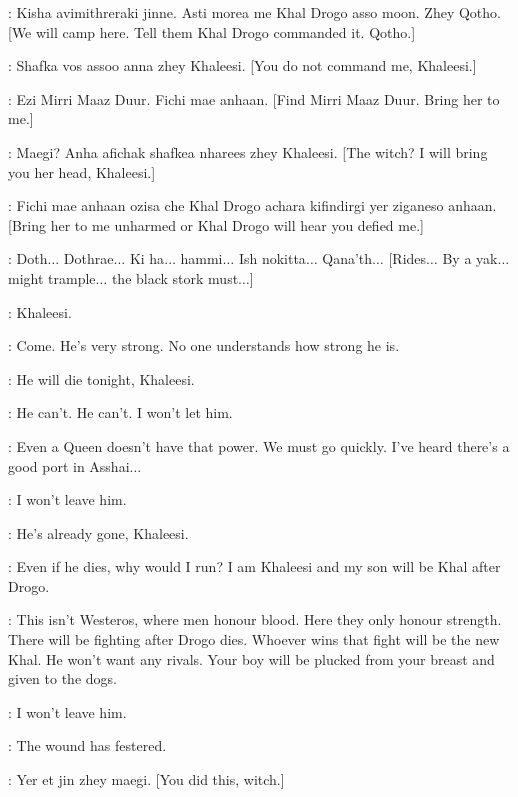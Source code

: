 \DAENERYS: Kisha avimithreraki jinne. Asti morea me Khal Drogo asso moon. Zhey Qotho. [We will camp here. Tell them Khal Drogo commanded it. Qotho.] 

\QOTHO: Shafka vos assoo anna zhey Khaleesi. [You do not command me, Khaleesi.] 

\DAENERYS: Ezi Mirri Maaz Duur. Fichi mae anhaan. [Find Mirri Maaz Duur. Bring her to me.] 

\QOTHO: Maegi? Anha afichak shafkea nharees zhey Khaleesi. [The witch? I will bring you her head, Khaleesi.] 

\DAENERYS: Fichi mae anhaan ozisa che Khal Drogo achara kifindirgi yer ziganeso anhaan. [Bring her to me unharmed or Khal Drogo will hear you defied me.] 


\DROGO: Doth$\ldots$ Dothrae$\ldots$ Ki ha$\ldots$ hammi$\ldots$ Ish nokitta$\ldots$ Qana'th$\ldots$ [Rides$\ldots$ By a yak$\ldots$ might trample$\ldots$ the black stork must$\ldots$] 

\JORAH: Khaleesi.  

\DAENERYS: Come.  He's very strong. No one understands how strong he is. 

\JORAH: He will die tonight, Khaleesi. 

\DAENERYS: He can't. He can't. I won't let him. 

\JORAH: Even a Queen doesn't have that power. We must go quickly. I've heard there's a good port in Asshai$\ldots$  

\DAENERYS: I won't leave him. 

\JORAH: He's already gone, Khaleesi. 

\DAENERYS: Even if he dies, why would I run? I am Khaleesi and my son will be Khal after Drogo. 

\JORAH: This isn't Westeros, where men honour blood. Here they only honour strength. There will be fighting after Drogo dies. Whoever wins that fight will be the new Khal. He won't want any rivals. Your boy will be plucked from your breast and given to the dogs. 

\DAENERYS: I won't leave him. 


\MIRRI: The wound has festered. 

\QOTHO: Yer et jin zhey maegi. [You did this, witch.] 

